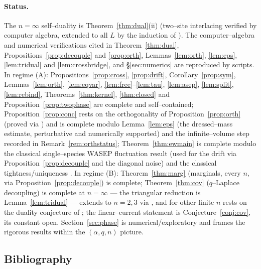 \documentclass[11pt]{article}
\theoremstyle{plain}
\theoremstyle{definition}
\theoremstyle{remark}
\begin{document}
\paragraph{Status.} The $n=\infty$ self--duality is Theorem~\ref{thm:dual}(ii)
(two--site interlacing verified by computer algebra, extended to all $L$ by the
induction of \cite{REU}). The computer--algebra and numerical verifications cited in
Theorem~\ref{thm:dual}, Propositions~\ref{prop:decouple} and \ref{prop:orth},
Lemmas~\ref{lem:orth}, \ref{lem:eps}, \ref{lem:tridual} and \ref{lem:crossbridge}, and
\S\ref{sec:numerics} are reproduced by scripts. In regime (A): Propositions~\ref{prop:cross},
\ref{prop:drift}, Corollary~\ref{prop:sym}, Lemmas~\ref{lem:orth}, \ref{lem:eqvar},
\ref{lem:free}--\ref{lem:tau}, \ref{lem:asep}, \ref{lem:split}, \ref{lem:rebind},
Theorems~\ref{thm:kernel}, \ref{thm:closed} and Proposition~\ref{prop:twophase} are
complete and self--contained; Proposition~\ref{prop:conc} rests on the orthogonality
of Proposition~\ref{prop:orth} (proved via \cite{CFG20}) and is complete modulo
Lemma~\ref{lem:eps} (the dressed--mass estimate, perturbative and numerically
supported) and the infinite--volume step recorded in Remark~\ref{rem:orthstatus}; Theorem~\ref{thm:ewmain} is complete modulo the classical
single--species WASEP fluctuation result (used for the drift via
Proposition~\ref{prop:decouple} and the diagonal noise) and the classical
tightness/uniqueness \cite{KL}. In regime
(B): Theorem~\ref{thm:marg} (marginals, every $n$, via
Proposition~\ref{prop:decouple}) is complete; Theorem~\ref{thm:cov} ($q$--Laplace
decoupling) is complete at $n=\infty$ --- the triangular reduction is
Lemma~\ref{lem:tridual} --- extends to $n=2,3$ via \cite{REU}, and for other finite
$n$ rests on the duality conjecture of \cite[Rmk.~4]{REU}; the linear--current
statement is Conjecture~\ref{conj:cov}, its constant open. Section~\ref{sec:phase} is numerical/exploratory and frames the rigorous
results within the $(\alpha,q,n)$ picture.


\subsection{Bibliography}
\end{document}
